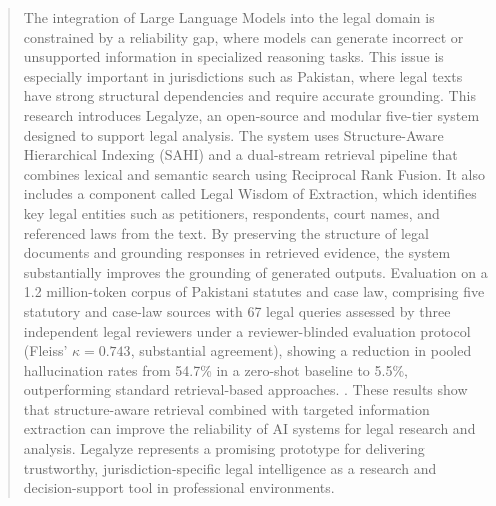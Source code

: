 \maketitle
\begin{abstract}
The integration of Large Language Models into the legal domain is constrained by a
reliability gap, where models can generate incorrect or unsupported information in
specialized reasoning tasks. This issue is especially important in jurisdictions such
as Pakistan, where legal texts have strong structural dependencies and require accurate
grounding. This research introduces Legalyze, an open-source and modular five-tier
system designed to support legal analysis. The system uses Structure-Aware Hierarchical
Indexing (SAHI) and a dual-stream retrieval pipeline that combines lexical and semantic
search using Reciprocal Rank Fusion. It also includes a component called Legal Wisdom of
Extraction, which identifies key legal entities such as petitioners, respondents, court
names, and referenced laws from the text. By preserving the structure of legal documents
and grounding responses in retrieved evidence, the system substantially improves the
grounding of generated outputs. Evaluation on a 1.2 million-token corpus of Pakistani
statutes and case law, comprising five statutory and case-law sources with 67 legal
queries assessed by three independent legal reviewers under a reviewer-blinded evaluation
protocol (Fleiss' $\kappa = 0.743$, substantial agreement), showing a reduction in
pooled hallucination rates from 54.7\% in a zero-shot baseline to 5.5\%,
outperforming standard retrieval-based approaches. . These results show that structure-aware
retrieval combined with targeted information extraction can improve the reliability of
AI systems for legal research and analysis. Legalyze represents a promising prototype
for delivering trustworthy, jurisdiction-specific legal intelligence as a research and
decision-support tool in professional environments.

\end{abstract}


